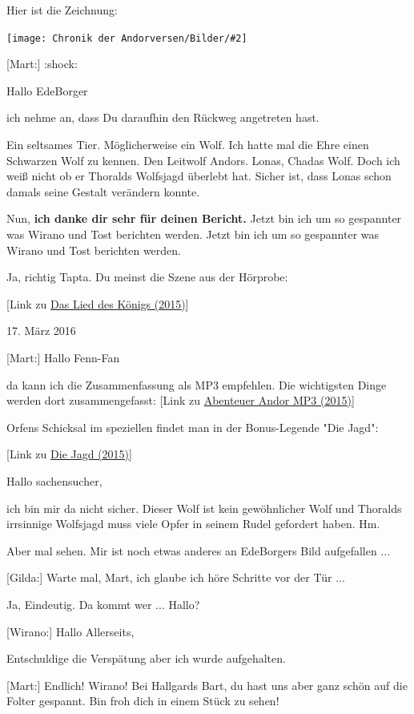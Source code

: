 \documentclass[10pt, a4paper, oneside]{book}
\newcommand{\reflegende}[1]{\hyperref[Legende: #1]{#1}}
\newcommand{\refprodukt}[1]{\hyperref[Produkt: #1]{#1}}
\newcommand{\refstorytext}[1]{\hyperref[Storytext: #1]{#1}}
\newcommand{\bildmitts}[2][height=0.32\textwidth,width=0.48\textwidth,keepaspectratio]{%
    \begin{center}
        \texttt{[image: Chronik der Andorversen/Bilder/\#2]}
    \end{center}
}
\begin{document}
\begin{multicols}{2}
Hier ist die Zeichnung:

\bildmitts{AA2016 Treffen mit Mart und Juna 9.jpeg}

[Mart:] :shock:

Hallo EdeBorger

ich nehme an, dass Du daraufhin den Rückweg angetreten hast.

Ein seltsames Tier. Möglicherweise ein Wolf. Ich hatte mal die Ehre einen Schwarzen Wolf zu kennen. Den Leitwolf Andors. Lonas, Chadas Wolf. Doch ich weiß nicht ob er Thoralds Wolfsjagd überlebt hat. Sicher ist, dass Lonas schon damals seine Gestalt verändern konnte.

Nun, \textbf{ich danke dir sehr für deinen Bericht.} Jetzt bin ich um so gespannter was Wirano und Tost berichten werden. Jetzt bin ich um so gespannter was Wirano und Tost berichten werden.

Ja, richtig Tapta. Du meinst die Szene aus der Hörprobe:

[Link zu \refprodukt{Das Lied des Königs (2015)}]

\begin{center}
    17. März 2016
\end{center}


[Mart:] Hallo Fenn-Fan

da kann ich die Zusammenfassung als MP3 empfehlen. Die wichtigsten Dinge werden dort zusammengefasst: [Link zu \refstorytext{Abenteuer Andor MP3 (2015)}]

Orfens Schicksal im speziellen findet man in der Bonus-Legende "Die Jagd":

[Link zu \reflegende{Die Jagd (2015)}]


Hallo sachensucher,

ich bin mir da nicht sicher. Dieser Wolf ist kein gewöhnlicher Wolf und Thoralds irrsinnige Wolfsjagd muss viele Opfer in seinem Rudel gefordert haben. Hm.

Aber mal sehen. Mir ist noch etwas anderes an EdeBorgers Bild aufgefallen ...

[Gilda:] Warte mal, Mart, ich glaube ich höre Schritte vor der Tür ...

Ja, Eindeutig. Da kommt wer ... Hallo?

[Wirano:] Hallo Allerseits,

Entschuldige die Verspätung aber ich wurde aufgehalten.

[Mart:] Endlich! Wirano! Bei Hallgards Bart, du hast uns aber ganz schön auf die Folter gespannt. Bin froh dich in einem Stück zu sehen!


\end{multicols}
\end{document}

